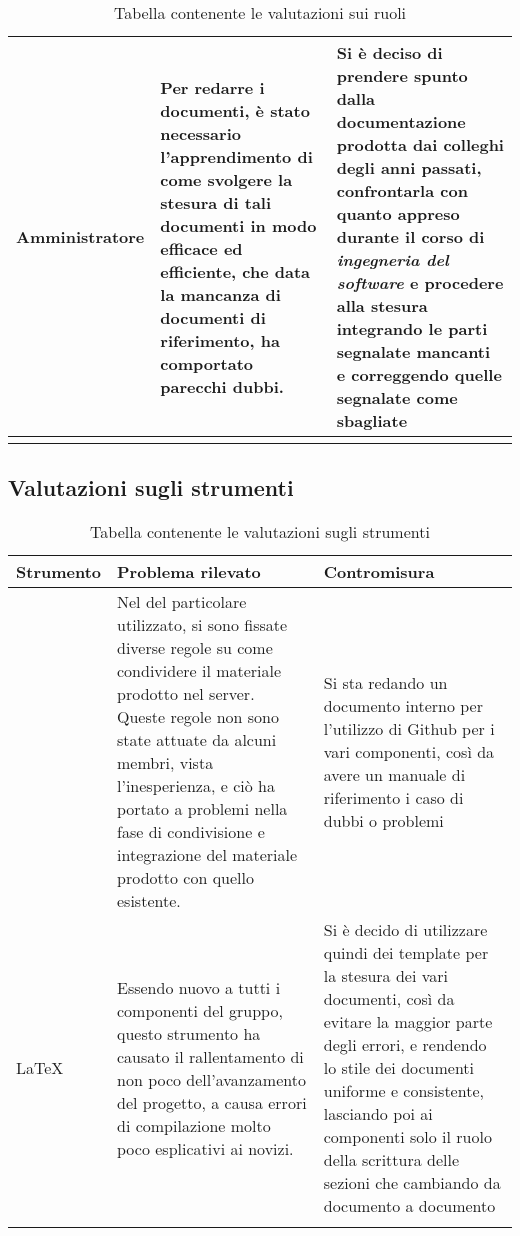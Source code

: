 \begin{center}
\begin{longtable}{|p{3cm}|p{6cm}|p{6cm}|}
			Amministratore
	 		&
			Per redarre i documenti, è stato necessario l'apprendimento di come svolgere la stesura di tali documenti in modo efficace ed efficiente, che data la mancanza di documenti di riferimento, ha comportato parecchi dubbi.
	 		&
			Si è deciso di prendere spunto dalla documentazione prodotta dai colleghi degli anni passati, confrontarla con quanto appreso durante il corso di \textit{ingegneria del software} e procedere alla stesura integrando le parti segnalate mancanti e correggendo quelle segnalate come sbagliate \\
			\hline
			\rowcolor{white}
			\caption{Tabella contenente le valutazioni sui ruoli}
			\end{longtable}
		\end{center}


	\subsection{Valutazioni sugli strumenti}

		\begin{center}
			\begin{longtable}{|p{3cm}|p{6cm}|p{6cm}|}
			\hline
			\rowcolor{lighter-grayer}
			\textbf{Strumento} & \textbf{Problema rilevato} & \textbf{Contromisura}\\
			\hline
			\endfirsthead

			\hline
			\glock{Version Control System}
	 		&
			Nel \glock{way of working} del particolare \glock{vcs} utilizzato, si sono fissate diverse regole su come condividere il materiale prodotto nel server. Queste regole non sono state attuate da alcuni membri, vista l'inesperienza, e ciò ha portato a problemi nella fase di condivisione e integrazione del materiale prodotto con quello esistente.
		 	&
			Si sta redando un documento interno per l'utilizzo di Github per i vari componenti, così da avere un manuale di riferimento i caso di dubbi o problemi  \\
			\hline
			\LaTeX
	 		&
			Essendo nuovo a tutti i componenti del gruppo, questo strumento ha causato il rallentamento di non poco dell'avanzamento del progetto, a causa errori di compilazione molto poco esplicativi ai novizi.
	 		&
			Si è decido di utilizzare quindi dei template per la stesura dei vari documenti, così da evitare la maggior parte degli errori, e rendendo lo stile dei documenti uniforme e consistente, lasciando poi ai componenti solo il ruolo della scrittura delle sezioni che cambiando da documento a documento \\
			\hline
			\rowcolor{white}
			\caption{Tabella contenente le valutazioni sugli strumenti}
			\end{longtable}
		\end{center}
